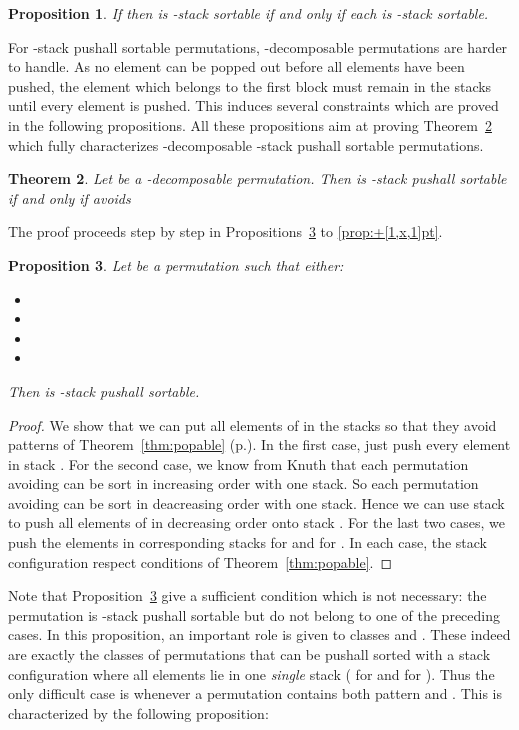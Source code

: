 \documentclass[11pt]{article}
\newtheorem{thm}{Theorem}[section]
\newtheorem{prop}[thm]{Proposition}
\newcommand{\pushall}{-stack pushall sortable\xspace}
\begin{document}
\begin{prop}
If  then  is -stack sortable if and only if each  is -stack sortable.
\end{prop}

For \pushall permutations, -decomposable permutations are harder to handle. 
As no element can be popped out before all elements have been pushed, the element  which belongs to the first block must remain in the stacks until every element is pushed. 
This induces several constraints which are proved in the following propositions. 
All these propositions aim at proving Theorem~\ref{thm:+pt} which fully characterizes -decomposable \pushall permutations.

\begin{thm}
\label{thm:+pt}
Let  be a -decomposable permutation. Then  is \pushall if and only if  avoids

\end{thm}

The proof proceeds step by step in Propositions~\ref{CS} to \ref{prop:+[1,x,1]pt}.

\begin{prop}\label{CS}
Let  be a permutation such that either:
\begin{itemize}
\item 
\item 
\item 
\item 
\end{itemize}
Then  is \pushall.
\end{prop}
\begin{proof}
We show that we can put all elements of  in the stacks so that they avoid patterns of Theorem~\ref{thm:popable} (p.\pageref{thm:popable}).
In the first case, just push every element in stack . 
For the second case, we know from Knuth \cite{Knuth73} that each permutation avoiding  can be sort in increasing order with one stack. 
So each permutation avoiding  can be sort in deacreasing order with one stack. 
Hence we can use stack  to push all elements of  in decreasing order onto stack . 
For the last two cases, we push the elements in corresponding stacks  for  and  for . 
In each case, the stack configuration respect conditions of Theorem~\ref{thm:popable}.
\end{proof}

Note that Proposition~\ref{CS} give a sufficient condition which is not necessary: the permutation  is \pushall but do not belong to one of the preceding cases. 
In this proposition, an important role is given to classes  and . 
These indeed are exactly the classes of permutations that can be pushall sorted with a stack configuration where all elements lie in one {\em single} stack ( for  and  for ). 
Thus the only difficult case is whenever a permutation contains both pattern  and . 
This is characterized by the following proposition:
\end{document}
